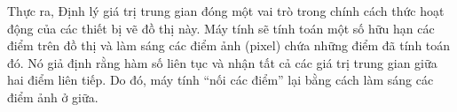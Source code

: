 \vspace{0.8em}
Thực ra, Định lý giá trị trung gian đóng một vai trò trong chính cách thức hoạt động của các thiết bị vẽ đồ thị này. Máy tính sẽ tính toán một số hữu hạn các điểm trên đồ thị và làm sáng các điểm ảnh (pixel) chứa những điểm đã tính toán đó. Nó giả định rằng hàm số liên tục và nhận tất cả các giá trị trung gian giữa hai điểm liên tiếp. Do đó, máy tính ``nối các điểm'' lại bằng cách làm sáng các điểm ảnh ở giữa.
